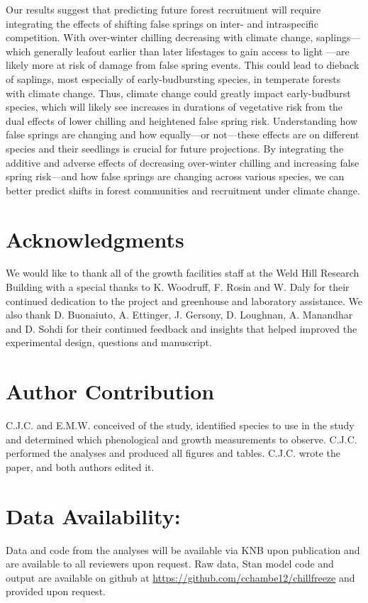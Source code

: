 \documentclass{article}\usepackage[]{graphicx}\usepackage[]{color}
\begin{document}
Our results suggest that predicting future forest recruitment will require integrating the effects of shifting false springs on inter- and intraspecific competition. With over-winter chilling decreasing with climate change, saplings---which generally leafout earlier than later lifestages to gain access to light \citep{Augspurger2009}---are likely more at risk of damage from false spring events. This could lead to dieback of saplings, most especially of early-budbursting species, in temperate forests with climate change. Thus, climate change could greatly impact early-budburst species, which will likely see increases in durations of vegetative risk from the dual effects of lower chilling and heightened false spring risk. Understanding how false springs are changing and how equally---or not---these effects are on different species and their seedlings is crucial for future projections. By integrating the additive and adverse effects of decreasing over-winter chilling and increasing false spring risk---and how false springs are changing across various species, we can better predict shifts in forest communities and recruitment under climate change. 

\section*{Acknowledgments}
We would like to thank all of the growth facilities staff at the Weld Hill Research Building with a special thanks to K. Woodruff, F. Rosin and W. Daly for their continued dedication to the project and greenhouse and laboratory assistance. We also thank D. Buonaiuto, A. Ettinger, J. Gersony, D. Loughnan, A. Manandhar and D. Sohdi for their continued feedback and insights that helped improved the experimental design, questions and manuscript.

\section*{Author Contribution} 
C.J.C. and E.M.W. conceived of the study, identified species to use in the study and determined which phenological and growth measurements to observe. C.J.C. performed the analyses and produced all figures and tables. C.J.C. wrote the paper, and both authors edited it.

\section*{Data Availability:}
Data and code from the analyses will be available via KNB upon publication and are available to all reviewers upon request. Raw data, {Stan} model code and output are available on github at \url{https://github.com/cchambe12/chillfreeze} and provided upon request.
\end{document}
